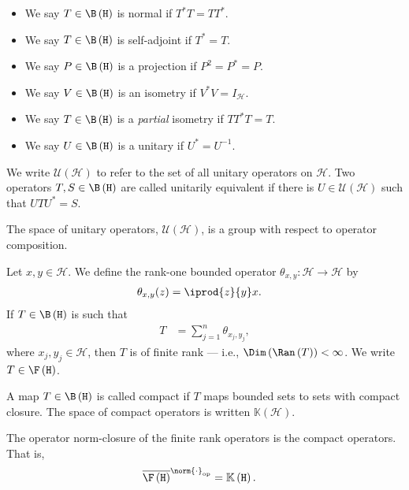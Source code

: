 \begin{definition}\hfill
  \begin{itemize}
    \item We say $T\in \B\left(\mathcal{H}\right)$ is normal if $T^{\ast}T = TT^{\ast}$.
    \item We say $T\in \B\left(\mathcal{H}\right)$ is self-adjoint if $T^{\ast}= T$.
    \item We say $P\in \B\left(\mathcal{H}\right)$ is a projection if $P^2 = P^{\ast} = P$.
    \item We say $V\in \B\left(\mathcal{H}\right)$ is an isometry if $V^{\ast}V = I_{\mathcal{H}}$.
    \item We say $T\in \B\left(\mathcal{H}\right)$ is a \textit{partial} isometry if $TT^{\ast}T = T$.
    \item We say $U\in \B\left(\mathcal{H}\right)$ is a unitary if $U^{\ast} = U^{-1}$.
  \end{itemize}
  We write $\mathcal{U}\left(\mathcal{H}\right)$ to refer to the set of all unitary operators on $\mathcal{H}$. Two operators $T,S\in \B\left(\mathcal{H}\right)$ are called unitarily equivalent if there is $U\in \mathcal{U}\left(\mathcal{H}\right)$ such that $UTU^{\ast} = S$.\newline

  The space of unitary operators, $\mathcal{U}\left(\mathcal{H}\right)$, is a group with respect to operator composition.
\end{definition}
\begin{definition}
  Let $x,y\in \mathcal{H}$. We define the rank-one bounded operator $\theta_{x,y}\colon \mathcal{H}\rightarrow \mathcal{H}$ by
  \begin{align*}
    \theta_{x,y}(z) &= \iprod{z}{y}x.
  \end{align*}
  If $T\in \B\left(\mathcal{H}\right)$ is such that
  \begin{align*}
    T &= \sum_{j=1}^{n}\theta_{x_j,y_j},
  \end{align*}
  where $x_j,y_j\in \mathcal{H}$, then $T$ is of finite rank --- i.e., $\Dim\left(\Ran\left(T\right)\right) < \infty$. We write $T\in \F\left(\mathcal{H}\right)$.\newline

  A map $T\in \B\left(\mathcal{H}\right)$ is called compact if $T$ maps bounded sets to sets with compact closure. The space of compact operators is written $\mathbb{K}\left(\mathcal{H}\right)$.
\end{definition}
\begin{theorem}
  The operator norm-closure of the finite rank operators is the compact operators. That is,
  \begin{align*}
    \overline{\F\left(\mathcal{H}\right)}^{\norm{\cdot}_{\op}} &= \mathbb{K}\left(\mathcal{H}\right).
  \end{align*}
\end{theorem}
